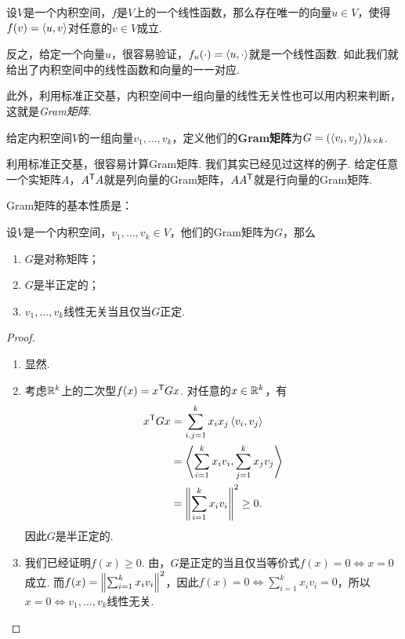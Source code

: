 \begin{theorem}[Riesz表示定理]\label{thm:riesz}
设$V$是一个内积空间，$f$是$V$上的一个线性函数，那么存在唯一的向量$u\in V$，使得$f(v)=\left\langle{u},{v}\right\rangle$对任意的$v\in V$成立.
\end{theorem}

反之，给定一个向量$u$，很容易验证，$f_u(\cdot)=\left\langle{u},{\cdot}\right\rangle$就是一个线性函数. 如此我们就给出了内积空间中的线性函数和向量的一一对应. 

此外，利用标准正交基，内积空间中一组向量的线性无关性也可以用内积来判断，这就是\textit{Gram矩阵}. 

\begin{definition}[Gram矩阵]\label{def:gram-matrix}
给定内积空间$V$的一组向量$v_1,\dots,v_k$，定义他们的\textbf{Gram矩阵}为$G=(\left\langle{v_i},{v_j}\right\rangle)_{k\times k}$. 
\end{definition}

利用标准正交基，很容易计算Gram矩阵. 我们其实已经见过这样的例子. 给定任意一个实矩阵$A$，$A^{\mathsf{T}} A$就是列向量的Gram矩阵，$AA^{\mathsf{T}}$就是行向量的Gram矩阵.

Gram矩阵的基本性质是：

\begin{proposition}\label{prop:gram}
设$V$是一个内积空间，$v_1,\dots,v_k\in V$，他们的Gram矩阵为$G$，那么
\begin{enumerate}
    \item $G$是对称矩阵；
    \item $G$是半正定的；
    \item $v_1,\dots,v_k$线性无关当且仅当$G$正定.
\end{enumerate}
\end{proposition}
\begin{proof}
\begin{enumerate}
    \item 显然.
    \item 考虑$\mathbb{R}^k$上的二次型$f(x)=x^{\mathsf{T}} Gx$. 对任意的$x\in\mathbb{R}^k$，有
    \begin{align*}
        x^{\mathsf{T}} G x&=\sum_{i,j=1}^kx_ix_j\left\langle{v_i},{v_j}\right\rangle\\
        &=\left\langle{\sum_{i=1}^kx_iv_i},{\sum_{j=1}^kx_jv_j}\right\rangle\\
        &=\left\|\sum_{i=1}^kx_iv_i\right\|^2\geq 0.
    \end{align*}
    因此$G$是半正定的.
    \item 我们已经证明$f(x)\geq 0$. 由，$G$是正定的当且仅当等价式$f(x)=0\iff x=0$成立. 而$f(x)=\left\|\sum_{i=1}^kx_iv_i\right\|^2$，因此$f(x)=0\iff \sum_{i=1}^kx_iv_i=0$，所以$x=0\iff v_1,\dots,v_k$线性无关.
\end{enumerate}
\end{proof}

